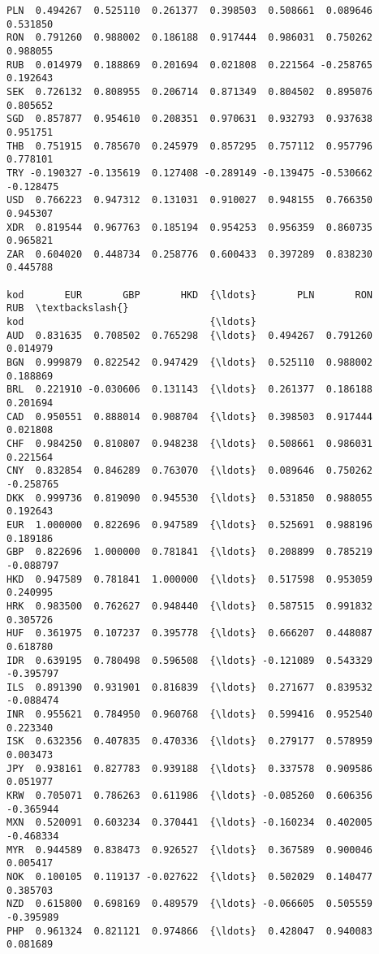 \documentclass[11pt]{article}
\begin{document}
\begin{tcolorbox}[breakable, size=fbox, boxrule=.5pt, pad at break*=1mm, opacityfill=0]
\begin{Verbatim}[commandchars=\\\{\}]
PLN  0.494267  0.525110  0.261377  0.398503  0.508661  0.089646  0.531850
RON  0.791260  0.988002  0.186188  0.917444  0.986031  0.750262  0.988055
RUB  0.014979  0.188869  0.201694  0.021808  0.221564 -0.258765  0.192643
SEK  0.726132  0.808955  0.206714  0.871349  0.804502  0.895076  0.805652
SGD  0.857877  0.954610  0.208351  0.970631  0.932793  0.937638  0.951751
THB  0.751915  0.785670  0.245979  0.857295  0.757112  0.957796  0.778101
TRY -0.190327 -0.135619  0.127408 -0.289149 -0.139475 -0.530662 -0.128475
USD  0.766223  0.947312  0.131031  0.910027  0.948155  0.766350  0.945307
XDR  0.819544  0.967763  0.185194  0.954253  0.956359  0.860735  0.965821
ZAR  0.604020  0.448734  0.258776  0.600433  0.397289  0.838230  0.445788

kod       EUR       GBP       HKD  {\ldots}       PLN       RON       RUB  \textbackslash{}
kod                                {\ldots}
AUD  0.831635  0.708502  0.765298  {\ldots}  0.494267  0.791260  0.014979
BGN  0.999879  0.822542  0.947429  {\ldots}  0.525110  0.988002  0.188869
BRL  0.221910 -0.030606  0.131143  {\ldots}  0.261377  0.186188  0.201694
CAD  0.950551  0.888014  0.908704  {\ldots}  0.398503  0.917444  0.021808
CHF  0.984250  0.810807  0.948238  {\ldots}  0.508661  0.986031  0.221564
CNY  0.832854  0.846289  0.763070  {\ldots}  0.089646  0.750262 -0.258765
DKK  0.999736  0.819090  0.945530  {\ldots}  0.531850  0.988055  0.192643
EUR  1.000000  0.822696  0.947589  {\ldots}  0.525691  0.988196  0.189186
GBP  0.822696  1.000000  0.781841  {\ldots}  0.208899  0.785219 -0.088797
HKD  0.947589  0.781841  1.000000  {\ldots}  0.517598  0.953059  0.240995
HRK  0.983500  0.762627  0.948440  {\ldots}  0.587515  0.991832  0.305726
HUF  0.361975  0.107237  0.395778  {\ldots}  0.666207  0.448087  0.618780
IDR  0.639195  0.780498  0.596508  {\ldots} -0.121089  0.543329 -0.395797
ILS  0.891390  0.931901  0.816839  {\ldots}  0.271677  0.839532 -0.088474
INR  0.955621  0.784950  0.960768  {\ldots}  0.599416  0.952540  0.223340
ISK  0.632356  0.407835  0.470336  {\ldots}  0.279177  0.578959  0.003473
JPY  0.938161  0.827783  0.939188  {\ldots}  0.337578  0.909586  0.051977
KRW  0.705071  0.786263  0.611986  {\ldots} -0.085260  0.606356 -0.365944
MXN  0.520091  0.603234  0.370441  {\ldots} -0.160234  0.402005 -0.468334
MYR  0.944589  0.838473  0.926527  {\ldots}  0.367589  0.900046  0.005417
NOK  0.100105  0.119137 -0.027622  {\ldots}  0.502029  0.140477  0.385703
NZD  0.615800  0.698169  0.489579  {\ldots} -0.066605  0.505559 -0.395989
PHP  0.961324  0.821121  0.974866  {\ldots}  0.428047  0.940083  0.081689

\end{Verbatim}
\end{tcolorbox}
\end{document}
